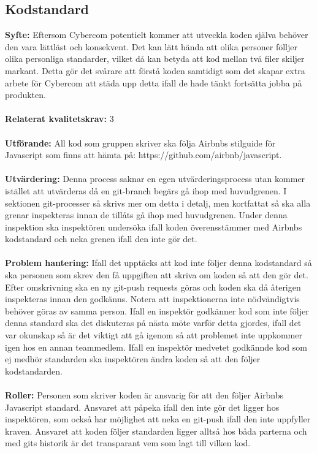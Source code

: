 \documentclass[10pt]{article}
\begin{document}
	\subsection{Kodstandard}
	\textbf{Syfte:}	Eftersom Cybercom potentielt kommer att utveckla koden själva behöver den vara lättläst och konsekvent. Det kan lätt hända att olika personer fölljer olika personliga standarder, vilket då kan betyda att kod mellan två filer skiljer markant. Detta gör det svårare att förstå koden samtidigt som det skapar extra arbete för Cybercom att städa upp detta ifall de hade tänkt fortsätta jobba på produkten.
	\\\\
	\textbf{Relaterat kvalitetskrav:} 3
	\\\\
	\textbf{Utförande:} All kod som gruppen skriver ska följa Airbnbs stilguide för Javascript som finns att hämta på: https://github.com/airbnb/javascript.
	\\\\
	\textbf{Utvärdering:} Denna process saknar en egen utvärderingsprocess utan kommer istället att utvärderas då en git-branch begärs gå ihop med huvudgrenen. I sektionen git-processer så skrivs mer om detta i detalj, men kortfattat så ska alla grenar inspekteras innan de tillåts gå ihop med huvudgrenen. Under denna inspektion ska inspektören undersöka ifall koden överensstämmer med Airbnbs kodstandard och neka grenen ifall den inte gör det.
	\\\\
	\textbf{Problem hantering:} Ifall det upptäcks att kod inte följer denna kodstandard så ska personen som skrev den få uppgiften att skriva om koden så att den gör det. Efter omskrivning ska en ny git-push requests göras och koden ska då återigen inspekteras innan den godkänns. Notera att inspektionerna inte nödvändigtvis behöver göras av samma person.
	Ifall en inspektör godkänner kod som inte följer denna standard ska det diskuteras på nästa möte varför detta gjordes, ifall det var okunskap så är det viktigt att gå igenom så att problemet inte uppkommer igen hos en annan teammedlem. Ifall en inspektör medvetet godkännde kod som ej medhör standarden ska inspektören ändra koden så att den följer kodstandarden.
	\\\\
	\textbf{Roller:} Personen som skriver koden är ansvarig för att den följer Airbnbs Javascript standard. Ansvaret att påpeka ifall den inte gör det ligger hos inspektören, som också har möjlighet att neka en git-push ifall den inte uppfyller kraven. Ansvaret att koden följer standarden ligger alltså hos båda parterna och med gits historik är det transparant vem som lagt till vilken kod.
	
\end{document}
